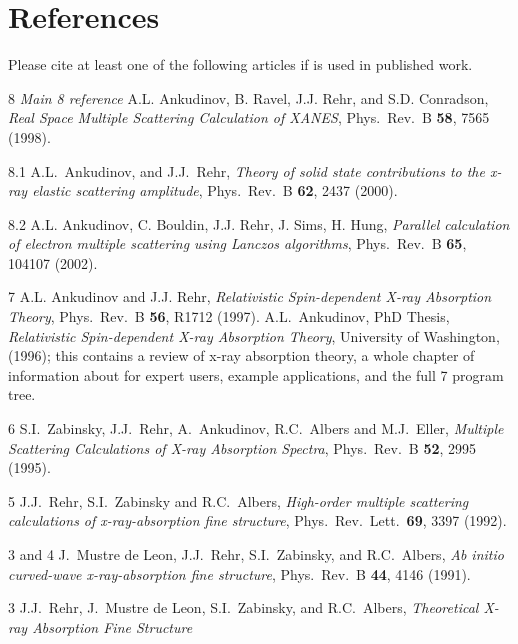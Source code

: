 \documentclass[11pt,oneside]{report} %
\begin{document}
{\chapter{References}
\label{sec:Append-C.-Refer}

Please cite at least one of the following articles if
{\feff} is used in published work.

\begin{Reflist}
\item[{\feff}8] {\it Main {\feff}8 reference} A.L. Ankudinov, B. Ravel,
  J.J. Rehr, and S.D. Conradson, \emph{Real Space Multiple Scattering
    Calculation of XANES}, Phys.\ Rev.\ B \textbf{58}, 7565 (1998).
\item[{\feff}8.1] A.L.\ Ankudinov, and
  J.J.\ Rehr, \emph{Theory of solid state contributions to the x-ray
  elastic scattering amplitude}, Phys.\ Rev.\ B \textbf{62}, 2437 (2000).
\item[{\feff}8.2] A.L. Ankudinov, C. Bouldin, J.J. Rehr, J. Sims, H. Hung,
   \emph{Parallel calculation of electron multiple scattering 
   using Lanczos algorithms}, Phys.\ Rev.\ B \textbf{65}, 104107 (2002).
\item[{\feff}7] A.L. Ankudinov and J.J. Rehr, \emph{Relativistic
    Spin-dependent X-ray Absorption Theory}, Phys.\ Rev.\ B \textbf{56},
  R1712 (1997).
  A.L.\ Ankudinov, PhD Thesis, \emph{Relativistic Spin-dependent
    X-ray Absorption Theory}, University of Washington, (1996); this
  contains a review of x-ray absorption theory, a whole chapter
  of information about {\feff} for expert users, example
  applications, and the full {\feff}7 program tree.
\item[{\feff}6] S.I.\ Zabinsky, J.J.\ Rehr, A.\ Ankudinov, R.C.\
  Albers and M.J.\ Eller, \emph{Multiple Scattering Calculations of
    X-ray Absorption Spectra}, Phys.\ Rev.\ B \textbf{52}, 2995 (1995).
\item[{\feff}5] J.J.\ Rehr, S.I.\ Zabinsky and R.C.\ Albers,
  \emph{High-order multiple scattering calculations of
    x-ray-absorption fine structure}, Phys.\ Rev.\ Lett.\ \textbf{69},
  3397 (1992).
\item[{\feff}3 and {\feff}4] J.\ Mustre de Leon, J.J.\ Rehr, S.I.\
  Zabinsky, and R.C.\ Albers, \emph{Ab initio curved-wave
    x-ray-absorption fine structure}, Phys.\ Rev.\ B \textbf{44}, 4146
  (1991).
\item[{\feff}3] J.J.\ Rehr, J.\ Mustre de Leon, S.I.\ Zabinsky, and
  R.C.\ Albers, \emph{Theoretical X-ray Absorption Fine Structure
}
\end{Reflist}}
\end{document}
